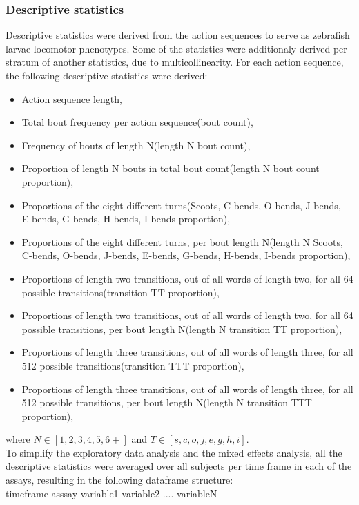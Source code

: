 \documentclass[a4paper,12pt]{article}
\begin{document}
\subsubsection{Descriptive statistics}
Descriptive statistics were derived from the action sequences to serve as zebrafish larvae locomotor phenotypes. Some of the statistics were additionaly derived per stratum of another statistics, due to multicollinearity. For each action sequence, the following descriptive statistics were derived:
\begin{itemize}
\item Action sequence length,
\item Total bout frequency per action sequence(bout count),
\item Frequency of bouts of length N(length N bout count),
\item Proportion of length N bouts in total bout count(length N bout count proportion),
\item Proportions of the eight different turns(Scoots, C-bends, O-bends, J-bends, E-bends, G-bends, H-bends, I-bends proportion), 
\item Proportions of the eight different turns, per bout length N(length N Scoots, C-bends, O-bends, J-bends, E-bends, G-bends, H-bends, I-bends proportion),
\item Proportions of length two transitions, out of all words of length two, for all 64 possible transitions(transition TT proportion),
\item Proportions of length two transitions, out of all words of length two, for all 64 possible transitions, per bout length N(length N transition TT proportion),  
\item Proportions of length three transitions, out of all words of length three, for all 512 possible transitions(transition TTT proportion),
\item Proportions of length three transitions, out of all words of length three, for all 512 possible transitions, per bout length N(length N transition TTT proportion), 
\end{itemize}
where $N\in [1,2,3,4,5,6+]$ and $T\in [s,c,o,j,e,g,h,i]$.
\\To simplify the exploratory data analysis and the mixed effects analysis, all the descriptive statistics were averaged over all subjects per time frame in each of the assays, resulting in the following dataframe structure:\\
\tiny{timeframe {\hspace{1cm}} asssay {\hspace{1cm}} variable1 {\hspace{1cm}} variable2 {\hspace{1cm}} .... {\hspace{1cm}} variableN}
\end{document}
